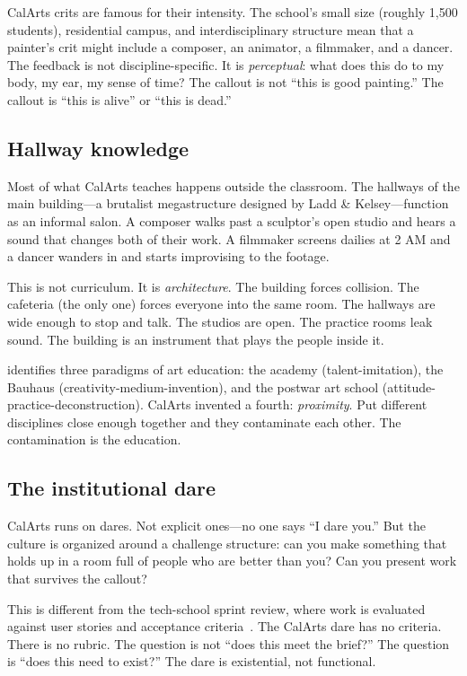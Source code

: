 \documentclass[10pt,letterpaper,twocolumn]{article}
\begin{document}
CalArts crits are famous for their intensity. The school's small size (roughly 1,500 students), residential campus, and interdisciplinary structure mean that a painter's crit might include a composer, an animator, a filmmaker, and a dancer. The feedback is not discipline-specific. It is \emph{perceptual}: what does this do to my body, my ear, my sense of time? The callout is not ``this is good painting.'' The callout is ``this is alive'' or ``this is dead.''

\subsection{Hallway knowledge}

Most of what CalArts teaches happens outside the classroom. The hallways of the main building---a brutalist megastructure designed by Ladd \& Kelsey---function as an informal salon. A composer walks past a sculptor's open studio and hears a sound that changes both of their work. A filmmaker screens dailies at 2 AM and a dancer wanders in and starts improvising to the footage.

This is not curriculum. It is \emph{architecture}. The building forces collision. The cafeteria (the only one) forces everyone into the same room. The hallways are wide enough to stop and talk. The studios are open. The practice rooms leak sound. The building is an instrument that plays the people inside it.

\citet{deduve1994attitude} identifies three paradigms of art education: the academy (talent-imitation), the Bauhaus (creativity-medium-invention), and the postwar art school (attitude-practice-deconstruction). CalArts invented a fourth: \emph{proximity}. Put different disciplines close enough together and they contaminate each other. The contamination is the education.

\subsection{The institutional dare}

CalArts runs on dares. Not explicit ones---no one says ``I dare you.'' But the culture is organized around a challenge structure: can you make something that holds up in a room full of people who are better than you? Can you present work that survives the callout?

This is different from the tech-school sprint review, where work is evaluated against user stories and acceptance criteria~\citep{vinsel2020innovation}. The CalArts dare has no criteria. There is no rubric. The question is not ``does this meet the brief?'' The question is ``does this need to exist?'' The dare is existential, not functional.
\end{document}
